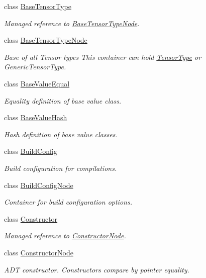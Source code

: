 \begin{DoxyCompactItemize}
class \hyperlink{classtvm_1_1BaseTensorType}{Base\+Tensor\+Type}
\begin{DoxyCompactList}\small\item\em Managed reference to \hyperlink{classtvm_1_1BaseTensorTypeNode}{Base\+Tensor\+Type\+Node}. \end{DoxyCompactList}\item 
class \hyperlink{classtvm_1_1BaseTensorTypeNode}{Base\+Tensor\+Type\+Node}
\begin{DoxyCompactList}\small\item\em Base of all Tensor types This container can hold \hyperlink{classtvm_1_1TensorType}{Tensor\+Type} or Generic\+Tensor\+Type. \end{DoxyCompactList}\item 
class \hyperlink{classtvm_1_1BaseValueEqual}{Base\+Value\+Equal}
\begin{DoxyCompactList}\small\item\em Equality definition of base value class. \end{DoxyCompactList}\item 
class \hyperlink{classtvm_1_1BaseValueHash}{Base\+Value\+Hash}
\begin{DoxyCompactList}\small\item\em Hash definition of base value classes. \end{DoxyCompactList}\item 
class \hyperlink{classtvm_1_1BuildConfig}{Build\+Config}
\begin{DoxyCompactList}\small\item\em Build configuration for compilations. \end{DoxyCompactList}\item 
class \hyperlink{classtvm_1_1BuildConfigNode}{Build\+Config\+Node}
\begin{DoxyCompactList}\small\item\em Container for build configuration options. \end{DoxyCompactList}\item 
class \hyperlink{classtvm_1_1Constructor}{Constructor}
\begin{DoxyCompactList}\small\item\em Managed reference to \hyperlink{classtvm_1_1ConstructorNode}{Constructor\+Node}. \end{DoxyCompactList}\item 
class \hyperlink{classtvm_1_1ConstructorNode}{Constructor\+Node}
\begin{DoxyCompactList}\small\item\em A\+DT constructor. Constructors compare by pointer equality. \end{DoxyCompactList}\item 

\end{DoxyCompactItemize}

